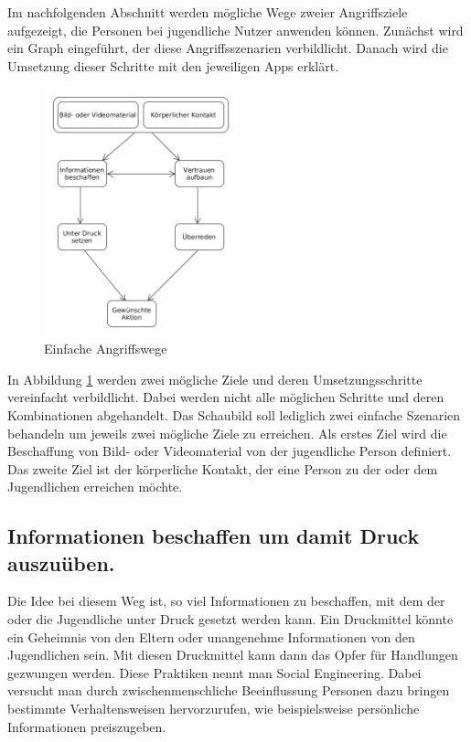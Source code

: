 Im nachfolgenden Abschnitt werden mögliche Wege zweier Angriffsziele aufgezeigt, die Personen bei jugendliche Nutzer anwenden können. Zunächst wird ein Graph eingeführt, der diese Angriffsszenarien verbildlicht. Danach wird die Umsetzung dieser Schritte mit den jeweiligen Apps erklärt. 

\begin{figure}[h!]
\centering
\includegraphics[width=0.5\textwidth]{./resources/angriffsvektoren}
\caption{Einfache Angriffswege}
\label{vektoren_overview}
\end{figure} 

%
In Abbildung \ref{vektoren_overview} werden zwei mögliche Ziele und deren Umsetzungsschritte vereinfacht verbildlicht. Dabei werden nicht alle möglichen Schritte und deren Kombinationen abgehandelt. Das Schaubild soll lediglich zwei einfache Szenarien behandeln um jeweils zwei mögliche Ziele zu erreichen. Als erstes Ziel wird die Beschaffung von Bild- oder Videomaterial von der jugendliche Person definiert.
Das zweite Ziel ist der körperliche Kontakt, der eine Person zu der oder dem Jugendlichen erreichen möchte.

\subsection{Informationen beschaffen um damit Druck auszuüben.}

Die Idee bei diesem Weg ist, so viel Informationen zu beschaffen, mit dem der oder die Jugendliche unter Druck gesetzt werden kann. Ein Druckmittel könnte ein Geheimnis von den Eltern oder unangenehme Informationen von den Jugendlichen sein. Mit diesen Druckmittel kann dann das Opfer für Handlungen gezwungen werden. Diese Praktiken nennt man Social Engineering. Dabei versucht man durch zwischenmenschliche Beeinflussung Personen dazu bringen bestimmte Verhaltensweisen hervorzurufen, wie beispielsweise persönliche Informationen preiszugeben.

